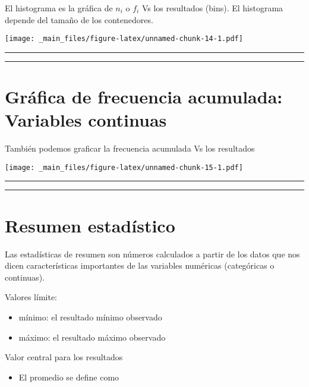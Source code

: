 \documentclass[
]{book}
\providecommand{\tightlist}{%
  \setlength{\itemsep}{0pt}\setlength{\parskip}{0pt}}
\begin{document}
El histograma es la gráfica de \(n_i\) o \(f_i\) Vs los resultados (bins). El histograma depende del tamaño de los contenedores.

\texttt{[image: \_main\_files/figure-latex/unnamed-chunk-14-1.pdf]}

\begin{center}\rule{0.5\linewidth}{0.5pt}\end{center}

\begin{center}\rule{0.5\linewidth}{0.5pt}\end{center}

\hypertarget{gruxe1fica-de-frecuencia-acumulada-variables-continuas}{%
\section{Gráfica de frecuencia acumulada: Variables continuas}\label{gruxe1fica-de-frecuencia-acumulada-variables-continuas}}

También podemos graficar la frecuencia acumulada Vs los resultados

\texttt{[image: \_main\_files/figure-latex/unnamed-chunk-15-1.pdf]}

\begin{center}\rule{0.5\linewidth}{0.5pt}\end{center}

\begin{center}\rule{0.5\linewidth}{0.5pt}\end{center}

\hypertarget{resumen-estaduxedstico}{%
\section{Resumen estadístico}\label{resumen-estaduxedstico}}

Las estadísticas de resumen son números calculados a partir de los datos que nos dicen características importantes de las variables numéricas (categóricas o continuas).

Valores límite:

\begin{itemize}
\tightlist
\item
  mínimo: el resultado mínimo observado
\item
  máximo: el resultado máximo observado
\end{itemize}

Valor central para los resultados

\begin{itemize}
\tightlist
\item
  El promedio se define como
\end{itemize}
\end{document}
